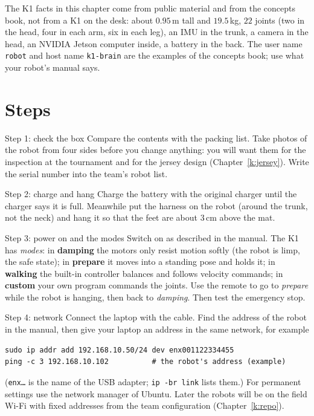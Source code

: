 \begin{guessbox}
The K1 facts in this chapter come from public material and from the concepts book, not from a K1 on the desk: about $0.95$\,m tall and $19.5$\,kg\guess, $22$ joints (two in the head, four in each arm, six in each leg), an IMU in the trunk, a camera in the head, an NVIDIA Jetson computer inside\guess, a battery in the back\guess. The user name \texttt{robot} and host name \texttt{k1-brain} are the examples of the concepts book; use what your robot's manual says.
\end{guessbox}

\section*{Steps}
\begin{stepbox}{Step 1: check the box}
Compare the contents with the packing list. Take photos of the robot from four sides before you change anything: you will want them for the inspection at the tournament and for the jersey design (Chapter~\ref{k:jersey}). Write the serial number into the team's robot list.
\end{stepbox}

\begin{stepbox}{Step 2: charge and hang}
Charge the battery with the original charger until the charger says it is full. Meanwhile put the harness on the robot (around the trunk, not the neck) and hang it so that the feet are about $3$\,cm above the mat.
\end{stepbox}

\begin{stepbox}{Step 3: power on and the modes}
Switch on as described in the manual. The K1 has \emph{modes}\guess: in \textbf{damping} the motors only resist motion softly (the robot is limp, the safe state); in \textbf{prepare} it moves into a standing pose and holds it; in \textbf{walking} the built-in controller balances and follows velocity commands; in \textbf{custom} your own program commands the joints. Use the remote to go to \emph{prepare} while the robot is hanging, then back to \emph{damping}. Then test the emergency stop.
\end{stepbox}

\begin{stepbox}{Step 4: network}
Connect the laptop with the cable. Find the address of the robot in the manual\guess, then give your laptop an address in the same network, for example
\begin{verbatim}
sudo ip addr add 192.168.10.50/24 dev enx001122334455
ping -c 3 192.168.10.102          # the robot's address (example)
\end{verbatim}
(\texttt{enx\dots} is the name of the USB adapter; \verb!ip -br link! lists them.) For permanent settings use the network manager of Ubuntu. Later the robots will be on the field Wi-Fi with fixed addresses from the team configuration (Chapter~\ref{k:repo}).
\end{stepbox}

